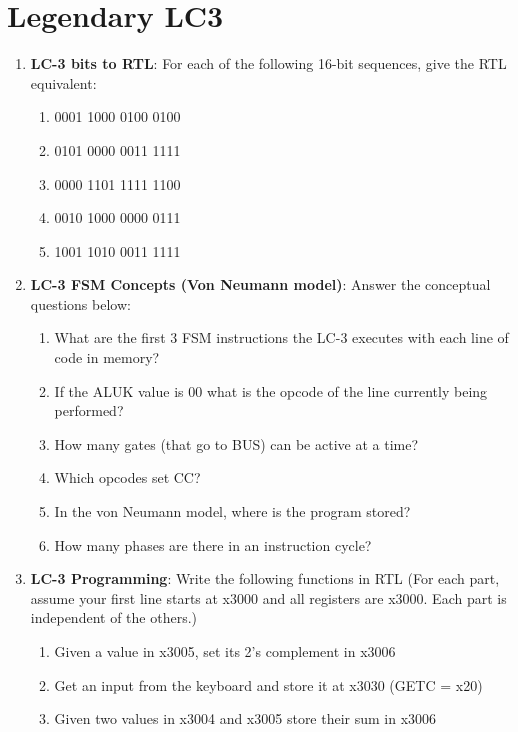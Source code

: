 \documentclass{article}
\begin{document}
\section{Legendary LC3}
    \begin{enumerate}[label=(\alph*)]
        \item \textbf{LC-3 bits to RTL}: For each of the following 16-bit sequences, give the RTL equivalent:
        \begin{enumerate}[label=(\roman*),itemsep = 10pt]
            \item 0001 1000 0100 0100
            \item 0101 0000 0011 1111
            \item 0000 1101 1111 1100 
            \item 0010 1000 0000 0111
            \item 1001 1010 0011 1111
        \end{enumerate}
        \newpage
        \item \textbf{LC-3 FSM Concepts (Von Neumann model)}: Answer the conceptual questions below:
        \begin{enumerate}[label=(\roman*),itemsep = 10pt]
            \item What are the first 3 FSM instructions the LC-3 executes with each line of code in memory?
            \item If the ALUK value is 00 what is the opcode of the line currently being performed?
            \item How many gates (that go to BUS) can be active at a time?
            \item Which opcodes set CC?
            \item In the von Neumann model, where is the program stored?
            \item How many phases are there in an instruction cycle?
        \end{enumerate}
        \item \textbf{LC-3 Programming}: Write the following functions in RTL (For each part, assume your first line starts at x3000 and all registers are x3000. Each part is independent of the others.)
        \begin{enumerate}[label=(\roman*),itemsep = 10pt]
            \item Given a value in x3005, set its 2’s complement in x3006
            \item Get an input from the keyboard and store it at x3030 (GETC = x20)
            \item Given two values in x3004 and x3005 store their sum in x3006

\end{enumerate}
\end{enumerate}
\end{document}
